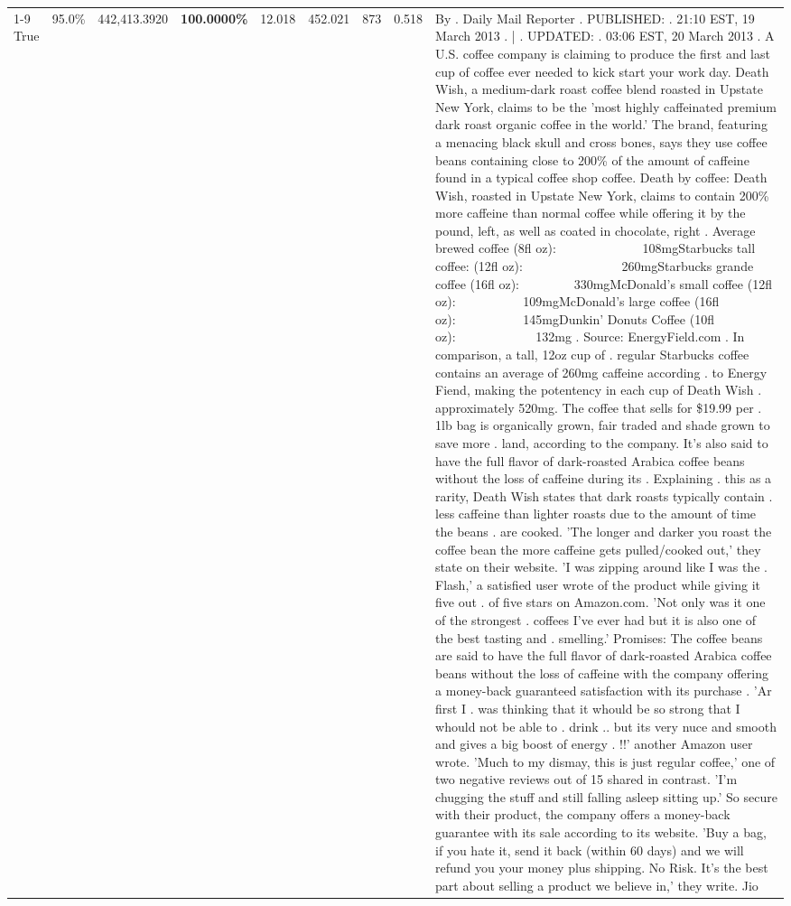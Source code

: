 \begin{table}[H]
{\begin{tabular}{lllrlllll}
\cline{1-9}
True & 95.0\% & 442,413.3920 & \bfseries \color{red} 100.0000\% & 12.018 & 452.021 & 873 & 0.518 & By . Daily Mail Reporter . PUBLISHED: . 21:10 EST, 19 March 2013 . | . UPDATED: . 03:06 EST, 20 March 2013 . A U.S. coffee company is claiming to produce the first and last cup of coffee ever needed to kick start your work day. Death Wish, a medium-dark roast coffee blend roasted in Upstate New York, claims to be the 'most highly caffeinated premium dark roast organic coffee in the world.' The brand, featuring a menacing black skull and cross bones, says they use coffee beans containing close to 200\% of the amount of caffeine found in a typical coffee shop coffee. Death by coffee: Death Wish, roasted in Upstate New York, claims to contain 200\% more caffeine than normal coffee while offering it by the pound, left, as well as coated in chocolate, right . Average brewed coffee (8fl oz):              108mgStarbucks tall coffee: (12fl oz):                260mgStarbucks grande coffee (16fl oz):         330mgMcDonald's small coffee (12fl oz):           109mgMcDonald's large coffee (16fl oz):           145mgDunkin' Donuts Coffee (10fl oz):             132mg . Source: EnergyField.com . In comparison, a tall, 12oz cup of . regular Starbucks coffee contains an average of 260mg caffeine according . to Energy Fiend, making the potentency in each cup of Death Wish . approximately 520mg. The coffee that sells for \$19.99 per . 1lb bag is organically grown, fair traded and shade grown to save more . land, according to the company. It's also said to have the full flavor of dark-roasted Arabica coffee beans without the loss of caffeine during its . Explaining . this as a rarity, Death Wish states that dark roasts typically contain . less caffeine than lighter roasts due to the amount of time the beans . are cooked. 'The longer and darker you roast the coffee bean the more caffeine gets pulled/cooked out,' they state on their website. 'I was zipping around like I was the . Flash,' a satisfied user wrote of the product while giving it five out . of five stars on Amazon.com. 'Not only was it one of the strongest . coffees I've ever had but it is also one of the best tasting and . smelling.’ Promises: The coffee beans are said to have the full flavor of dark-roasted Arabica coffee beans without the loss of caffeine with the company offering a money-back guaranteed satisfaction with its purchase . 'Ar first I . was thinking that it whould be so strong that I whould not be able to . drink .. but its very nuce and smooth and gives a big boost of energy . !!' another Amazon user wrote. 'Much to my dismay, this is just regular coffee,' one of two negative reviews out of 15 shared in contrast. 'I'm chugging the stuff and still falling asleep sitting up.' So secure with their product, the company offers a money-back guarantee with its sale according to its website. 'Buy a bag, if you hate it, send it back (within 60 days) and we will refund you your money plus shipping. No Risk. It’s the best part about selling a product we believe in,' they write. Jio \\

\end{tabular}}
\end{table}
